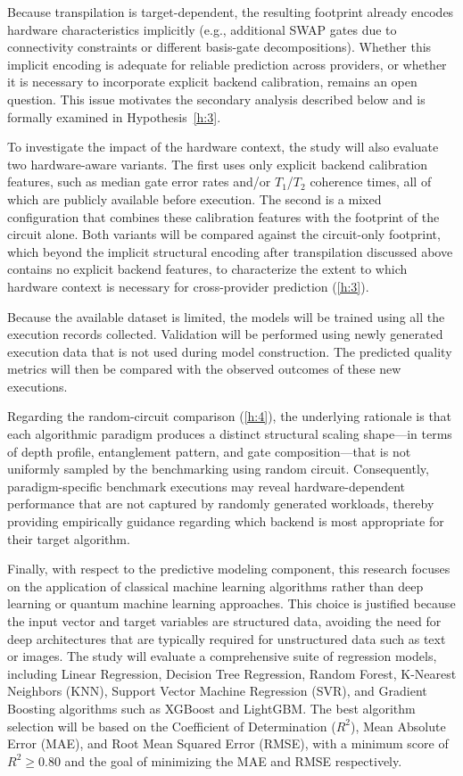 \documentclass{article}
\begin{document}
Because transpilation is target-dependent, the resulting footprint already encodes hardware characteristics implicitly (e.g., additional SWAP gates due to connectivity constraints or different basis-gate decompositions). Whether this implicit encoding is adequate for reliable prediction across providers, or whether it is necessary to incorporate explicit backend calibration, remains an open question. This issue motivates the secondary analysis described below and is formally examined in Hypothesis~\ref{h:3}.

To investigate the impact of the hardware context, the study will also evaluate two hardware-aware variants. The first uses only explicit backend calibration features, such as median gate error rates and/or $T_1$/$T_2$ coherence times, all of which are publicly available before execution. The second is a mixed configuration that combines these calibration features with the footprint of the circuit alone. Both variants will be compared against the circuit-only footprint, which beyond the implicit structural encoding after transpilation discussed above contains no explicit backend features, to characterize the extent to which hardware context is necessary for cross-provider prediction (\ref{h:3}).

Because the available dataset is limited, the models will be trained using all the execution records collected. Validation will be performed using newly generated execution data that is not used during model construction. The predicted quality metrics will then be compared with the observed outcomes of these new executions.

Regarding the random-circuit comparison (\ref{h:4}), the underlying rationale is that each algorithmic paradigm produces a distinct structural scaling shape---in terms of depth profile, entanglement pattern, and gate composition---that is not uniformly sampled by the benchmarking using random circuit. Consequently, paradigm-specific benchmark executions may reveal hardware-dependent performance that are not captured by randomly generated workloads, thereby providing empirically guidance regarding which backend is most appropriate for their target algorithm.

Finally, with respect to the predictive modeling component, this research focuses on the application of classical machine learning algorithms rather than deep learning or quantum machine learning approaches. This choice is justified because the input vector and target variables are structured data, avoiding the need for deep architectures that are typically required for unstructured data such as text or images. The study will evaluate a comprehensive suite of regression models, including Linear Regression, Decision Tree Regression, Random Forest, K-Nearest Neighbors (KNN), Support Vector Machine Regression (SVR), and Gradient Boosting algorithms such as XGBoost and LightGBM. The best algorithm selection will be based on the Coefficient of Determination ($R^2$), Mean Absolute Error (MAE), and Root Mean Squared Error (RMSE), with a minimum score of $R^2 \geq 0.80$ and the goal of minimizing the MAE and RMSE respectively.
\end{document}
